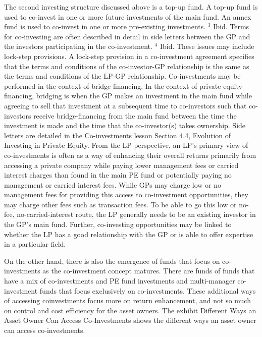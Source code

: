 \documentclass[11pt]{article}
\begin{document}
The second investing structure discussed above is a top-up fund. A top-up fund is used to co-invest in one or more future investments of the main fund. An annex fund is used to co-invest in one or more pre-existing investments. ${ }^{3}$ Ibid. Terms for co-investing are often described in detail in side letters between the GP and the investors participating in the co-investment. ${ }^{4}$ Ibid. These issues may include lock-step provisions. A lock-step provision in a co-investment agreement specifies that the terms and conditions of the co-investor-GP relationship is the same as the terms and conditions of the LP-GP relationship. Co-investments may be performed in the context of bridge financing. In the context of private equity financing, bridging is when the GP makes an investment in the main fund while agreeing to sell that investment at a subsequent time to co-investors such that co-investors receive bridge-financing from the main fund between the time the investment is made and the time that the co-investor(s) takes ownership. Side letters are detailed in the Co-investments lesson Section 4.4, Evolution of Investing in Private Equity. From the LP perspective, an LP's primary view of co-investments is often as a way of enhancing their overall returns primarily from accessing a private company while paying lower management fees or carried interest charges than found in the main PE fund or potentially paying no management or carried interest fees. While GPs may charge low or no management fees for providing this access to co-investment opportunities, they may charge other fees such as transaction fees. To be able to go this low or no-fee, no-carried-interest route, the LP generally needs to be an existing investor in the GP's main fund. Further, co-investing opportunities may be linked to whether the LP has a good relationship with the GP or is able to offer expertise in a particular field.

On the other hand, there is also the emergence of funds that focus on co-investments as the co-investment concept matures. There are funds of funds that have a mix of co-investments and PE fund investments and multi-manager co-investment funds that focus exclusively on co-investments. These additional ways of accessing coinvestments focus more on return enhancement, and not so much on control and cost efficiency for the asset owners. The exhibit Different Ways an Asset Owner Can Access Co-Investments shows the different ways an asset owner can access co-investments.
\end{document}
